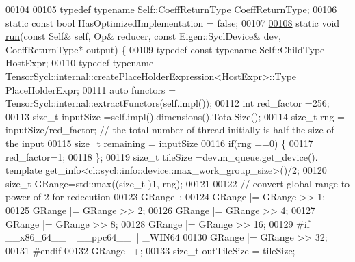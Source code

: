 \begin{DoxyCode}
00104 
00105   \textcolor{keyword}{typedef} \textcolor{keyword}{typename} Self::CoeffReturnType CoeffReturnType;
00106   \textcolor{keyword}{static} \textcolor{keyword}{const} \textcolor{keywordtype}{bool} HasOptimizedImplementation = \textcolor{keyword}{false};
00107 
\hyperlink{struct_eigen_1_1internal_1_1_full_reducer_3_01_self_00_01_op_00_01const_01_eigen_1_1_sycl_device_00_01_vectorizable_01_4_aee608a1f9a8dca2b99477c2738357c05}{00108}   \textcolor{keyword}{static} \textcolor{keywordtype}{void} \hyperlink{struct_eigen_1_1internal_1_1_full_reducer_3_01_self_00_01_op_00_01const_01_eigen_1_1_sycl_device_00_01_vectorizable_01_4_aee608a1f9a8dca2b99477c2738357c05}{run}(\textcolor{keyword}{const} Self& \textcolor{keyword}{self}, Op& reducer, \textcolor{keyword}{const} Eigen::SyclDevice& dev, CoeffReturnType* output) 
      \{
00109     \textcolor{keyword}{typedef} \textcolor{keyword}{const} \textcolor{keyword}{typename} Self::ChildType HostExpr; 
00110     \textcolor{keyword}{typedef}  \textcolor{keyword}{typename} TensorSycl::internal::createPlaceHolderExpression<HostExpr>::Type PlaceHolderExpr;
00111     \textcolor{keyword}{auto} functors = TensorSycl::internal::extractFunctors(\textcolor{keyword}{self}.impl());
00112     \textcolor{keywordtype}{int} red\_factor =256; 
00113     \textcolor{keywordtype}{size\_t} inputSize =\textcolor{keyword}{self}.impl().dimensions().TotalSize();
00114     \textcolor{keywordtype}{size\_t} rng = inputSize/red\_factor; \textcolor{comment}{// the total number of thread initially is half the size of the
       input}
00115     \textcolor{keywordtype}{size\_t} remaining = inputSize%
00116     \textcolor{keywordflow}{if}(rng ==0) \{
00117       red\_factor=1;
00118     \};
00119     \textcolor{keywordtype}{size\_t} tileSize =dev.m\_queue.get\_device(). \textcolor{keyword}{template} 
      get\_info<cl::sycl::info::device::max\_work\_group\_size>()/2;
00120     \textcolor{keywordtype}{size\_t} GRange=std::max((\textcolor{keywordtype}{size\_t} )1, rng);
00121 
00122     \textcolor{comment}{// convert global range to power of 2 for redecution}
00123     GRange--;
00124     GRange |= GRange >> 1;
00125     GRange |= GRange >> 2;
00126     GRange |= GRange >> 4;
00127     GRange |= GRange >> 8;
00128     GRange |= GRange >> 16;
00129 \textcolor{preprocessor}{#if \_\_x86\_64\_\_ || \_\_ppc64\_\_ || \_WIN64}
00130     GRange |= GRange >> 32;
00131 \textcolor{preprocessor}{#endif}
00132     GRange++;
00133     \textcolor{keywordtype}{size\_t}  outTileSize = tileSize;

\end{DoxyCode}
